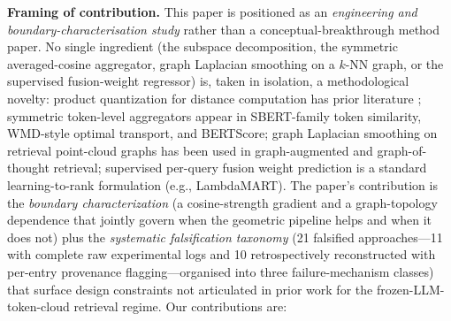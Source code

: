 \documentclass[review,1p]{elsarticle}
\begin{document}
\textbf{Framing of contribution.} This paper is positioned as an \emph{engineering and boundary-characterisation study} rather than a conceptual-breakthrough method paper. No single ingredient (the subspace decomposition, the symmetric averaged-cosine aggregator, graph Laplacian smoothing on a $k$-NN graph, or the supervised fusion-weight regressor) is, taken in isolation, a methodological novelty: product quantization for distance computation has prior literature \citep{jegou2011pq}; symmetric token-level aggregators appear in SBERT-family token similarity, WMD-style optimal transport, and BERTScore; graph Laplacian smoothing on retrieval point-cloud graphs has been used in graph-augmented and graph-of-thought retrieval; supervised per-query fusion weight prediction is a standard learning-to-rank formulation (e.g., LambdaMART). The paper's contribution is the \emph{boundary characterization} (a cosine-strength gradient and a graph-topology dependence that jointly govern when the geometric pipeline helps and when it does not) plus the \emph{systematic falsification taxonomy} (21 falsified approaches---11 with complete raw experimental logs and 10 retrospectively reconstructed with per-entry provenance flagging---organised into three failure-mechanism classes) that surface design constraints not articulated in prior work for the frozen-LLM-token-cloud retrieval regime. Our contributions are:
\end{document}
